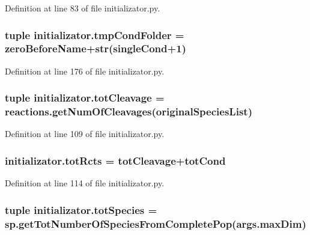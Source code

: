 Definition at line 83 of file initializator.\-py.

\hypertarget{a00135_ad43d43e724c966749db268c9b523a02c}{
\subsubsection[{tmp\-Cond\-Folder}]{\setlength{\rightskip}{0pt plus 5cm}tuple initializator.\-tmp\-Cond\-Folder = {\bf zero\-Before\-Name}+str(single\-Cond+1)}}\label{a00135_ad43d43e724c966749db268c9b523a02c}


Definition at line 176 of file initializator.\-py.

\hypertarget{a00135_a517da3913f56e5216fa2c68818e04ecc}{
\subsubsection[{tot\-Cleavage}]{\setlength{\rightskip}{0pt plus 5cm}tuple initializator.\-tot\-Cleavage = reactions.\-get\-Num\-Of\-Cleavages({\bf original\-Species\-List})}}\label{a00135_a517da3913f56e5216fa2c68818e04ecc}


Definition at line 109 of file initializator.\-py.

\hypertarget{a00135_a1c0855f92c2dd2dd4a30f6624f6e1af0}{
\subsubsection[{tot\-Rcts}]{\setlength{\rightskip}{0pt plus 5cm}initializator.\-tot\-Rcts = {\bf tot\-Cleavage}+tot\-Cond}}\label{a00135_a1c0855f92c2dd2dd4a30f6624f6e1af0}


Definition at line 114 of file initializator.\-py.

\hypertarget{a00135_a7f8e1635318ca1aac728dd7165aa49b5}{
\subsubsection[{tot\-Species}]{\setlength{\rightskip}{0pt plus 5cm}tuple initializator.\-tot\-Species = sp.\-get\-Tot\-Number\-Of\-Species\-From\-Complete\-Pop(args.\-max\-Dim)}}\label{a00135_a7f8e1635318ca1aac728dd7165aa49b5}


